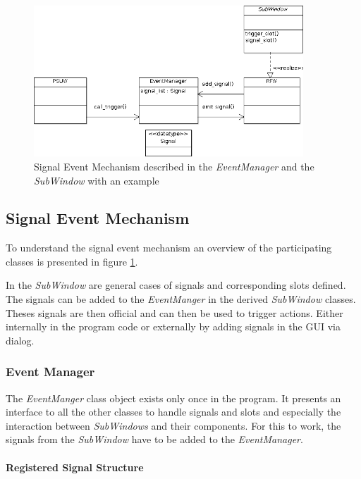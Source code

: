 \documentclass[10pt,a4paper]{article}
\begin{document}
\begin{figure}[H]
\centering
\includegraphics[width=0.9\textwidth]{./A_EventManager.png}
\caption{Signal Event Mechanism described in the \textit{EventManager} and the \textit{SubWindow} with an example}
\label{f:signal_event_mechanism}
\end{figure}

\subsection{Signal Event Mechanism}

To understand the signal event mechanism an overview of the participating classes is presented in figure \ref{f:signal_event_mechanism}. 

\bigbreak

In the \textit{SubWindow} are general cases of signals and corresponding slots defined. The signals can be added to the \textit{EventManger} in the derived \textit{SubWindow} classes. Theses signals are then official and can then be used to trigger actions. Either internally in the program code or externally by adding signals in the GUI via dialog. 

	\subsubsection{Event Manager}
	
	The \textit{EventManger} class object exists only once in the program. It presents an interface to all the other classes to handle signals and slots and especially the interaction between \textit{SubWindows} and their components. For this to work, the signals from the \textit{SubWindow} have to be added to the \textit{EventManager}.
	
		\paragraph{Registered Signal Structure}
\end{document}
